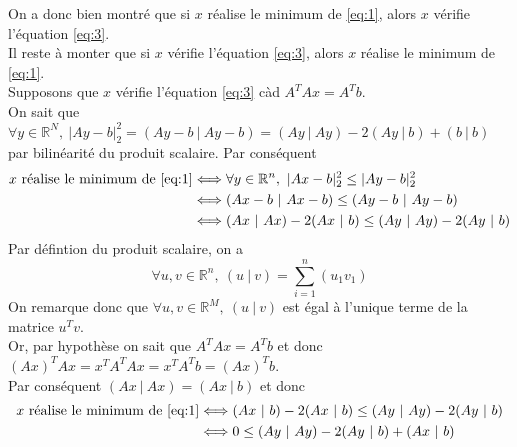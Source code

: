 \documentclass[a4paper, 10pt]{article}
\newcommand{\IR}{\mathbb{R}}
\begin{document}
On a donc bien montré que si \( x \) réalise le minimum de \eqref{eq:1}, alors \( x \) vérifie l'équation \eqref{eq:3}. \\
Il reste à monter que si \( x \) vérifie l'équation \eqref{eq:3}, alors \( x \) réalise le minimum de \eqref{eq:1}. \\
Supposons que \( x \) vérifie l'équation \eqref{eq:3} càd \( A^T A x = A^T b \). \\
On sait que \( \forall y \in \IR^N,~ |Ay - b|_2^2 = (Ay - b ~|~ Ay - b) = (Ay ~|~ Ay) - 2(Ay ~|~ b) + (b ~|~ b) \) par bilinéarité du produit scalaire. Par conséquent
\begin{align*}
    x \text{ réalise le minimum de } \eqref{eq:1}
    & \Longleftrightarrow \forall y \in \IR^n,~ |Ax - b|_2^2 \leq |Ay - b|_2^2 \\
    & \Longleftrightarrow (Ax - b ~|~ Ax - b) \leq (Ay - b ~|~ Ay - b) \\
    & \Longleftrightarrow (Ax ~|~ Ax) - 2(Ax ~|~ b) \leq (Ay ~|~ Ay) - 2(Ay ~|~ b)
\end{align*}
Par défintion du produit scalaire, on a
$$
\forall u, v \in \IR^n,~ (u ~|~ v) = \sum_{i = 1}^n (u_1 v_1)
$$
On remarque donc que \( \forall u, v \in \IR^M,~ (u ~|~ v) \) est égal à l'unique terme de la matrice \( u^T v \). \\
Or, par hypothèse on sait que \( A^TAx = A^Tb \) et donc \( (Ax)^T Ax = x^T A^T A x = x^T A^Tb = (Ax)^T b \). \\
Par conséquent \( (Ax ~|~ Ax) = (Ax ~|~ b) \) et donc
\begin{align*}
    x \text{ réalise le minimum de } \eqref{eq:1}
    & \Longleftrightarrow (Ax ~|~ b) - 2(Ax ~|~ b) \leq (Ay ~|~ Ay) - 2(Ay ~|~ b) \\
    & \Longleftrightarrow 0 \leq (Ay ~|~ Ay) - 2(Ay ~|~ b) + (Ax ~|~ b)
\end{align*}
\end{document}
